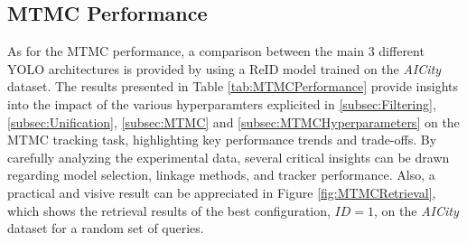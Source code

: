 \subsection{MTMC Performance}
As for the MTMC performance, a comparison between the main 3 different YOLO architectures is provided by using a ReID model trained on the \textit{AICity} dataset. The results presented in Table \ref{tab:MTMCPerformance} provide insights into the impact of the various hyperparamters explicited in \ref{subsec:Filtering}, \ref{subsec:Unification}, \ref{subsec:MTMC} and \ref{subsec:MTMCHyperparameters} on the MTMC tracking task, highlighting key performance trends and trade-offs. By carefully analyzing the experimental data, several critical insights can be drawn regarding model selection, linkage methods, and tracker performance. Also, a practical and visive result can be appreciated in Figure \ref{fig:MTMCRetrieval}, which shows the retrieval results of the best configuration, $ID = 1$, on the \textit{AICity} dataset for a random set of queries.

